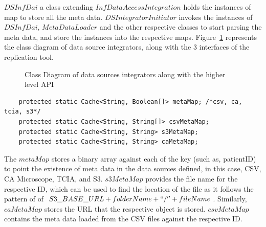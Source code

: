 \documentclass[conference]{IEEEtran}
\begin{document}
$DSInfDai$ a class extending $InfDataAccessIntegration$ holds the instances of map to store all the meta data. $DSIntegratorInitiator$ invokes the instances of $DSInfDai$, $MetaDataLoader$ and the other respective classes to start parsing the meta data, and store the instances into the respective maps. Figure~\ref{fig:dsclass} represents the class diagram of data source integrators, along with the 3 interfaces of the replication tool.

\begin{figure}[!htbp]
\begin{center}
\end{center}
 \caption{Class Diagram of data sources integrators along with the higher level API}
 \label{fig:dsclass}
\end{figure}

\begin{lstlisting}  
    protected static Cache<String, Boolean[]> metaMap; /*csv, ca, tcia, s3*/
    protected static Cache<String, String[]> csvMetaMap;
    protected static Cache<String, String> s3MetaMap;
    protected static Cache<String, String> caMetaMap;
\end{lstlisting} 
The $metaMap$ stores a binary array against each of the key (such as, patientID) to point the existence of meta data in the data sources defined, in this case, CSV, CA Microscope, TCIA, and S3. $s3MetaMap$ provides the file name for the respective ID, which can be used to find the location of the file as it follows the pattern of of $S3\_BASE\_URL + folderName + ``/'' + fileName$. Similarly, $caMetaMap$ stores the URL that the respective object is stored. $csvMetaMap$ contains the meta data loaded from the CSV files against the respective ID.
\end{document}
